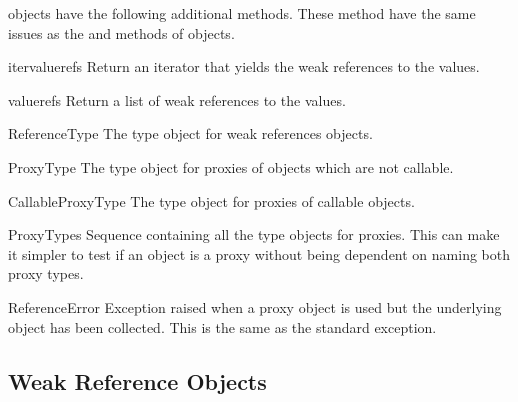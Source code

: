  objects have the following additional
methods.  These method have the same issues as the
 and  methods of
 objects.

\begin{methoddesc}{itervaluerefs}{}
  Return an iterator that yields the weak references to the values.
\end{methoddesc}

\begin{methoddesc}{valuerefs}{}
  Return a list of weak references to the values.
\end{methoddesc}

\begin{datadesc}{ReferenceType}
  The type object for weak references objects.
\end{datadesc}

\begin{datadesc}{ProxyType}
  The type object for proxies of objects which are not callable.
\end{datadesc}

\begin{datadesc}{CallableProxyType}
  The type object for proxies of callable objects.
\end{datadesc}

\begin{datadesc}{ProxyTypes}
  Sequence containing all the type objects for proxies.  This can make
  it simpler to test if an object is a proxy without being dependent
  on naming both proxy types.
\end{datadesc}

\begin{excdesc}{ReferenceError}
  Exception raised when a proxy object is used but the underlying
  object has been collected.  This is the same as the standard
   exception.
\end{excdesc}


\begin{seealso}
\end{seealso}


\subsection{Weak Reference Objects
            \label{weakref-objects}}

